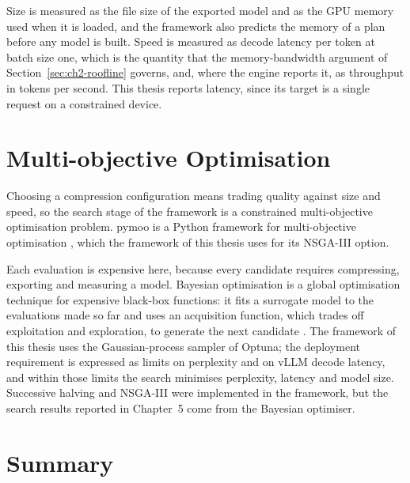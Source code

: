 Size is measured as the file size of the exported model and as the GPU memory used when it is loaded, and the framework also predicts the memory of a plan before any model is built. Speed is measured as decode latency per token at batch size one, which is the quantity that the memory-bandwidth argument of Section~\ref{sec:ch2-roofline} governs, and, where the engine reports it, as throughput in tokens per second. This thesis reports latency, since its target is a single request on a constrained device.

\section{Multi-objective Optimisation}
\label{sec:ch2-moo}

Choosing a compression configuration means trading quality against size and speed, so the search stage of the framework is a constrained multi-objective optimisation problem. pymoo is a Python framework for multi-objective optimisation \cite{blank2020pymoo}, which the framework of this thesis uses for its NSGA-III option.

Each evaluation is expensive here, because every candidate requires compressing, exporting and measuring a model. Bayesian optimisation is a global optimisation technique for expensive black-box functions: it fits a surrogate model to the evaluations made so far and uses an acquisition function, which trades off exploitation and exploration, to generate the next candidate \cite{bischl2021hpo}. The framework of this thesis uses the Gaussian-process sampler of Optuna; the deployment requirement is expressed as limits on perplexity and on vLLM decode latency, and within those limits the search minimises perplexity, latency and model size. Successive halving \cite{bischl2021hpo} and NSGA-III were implemented in the framework, but the search results reported in Chapter~5 come from the Bayesian optimiser.

\section{Summary}
\label{sec:ch2-summary}


